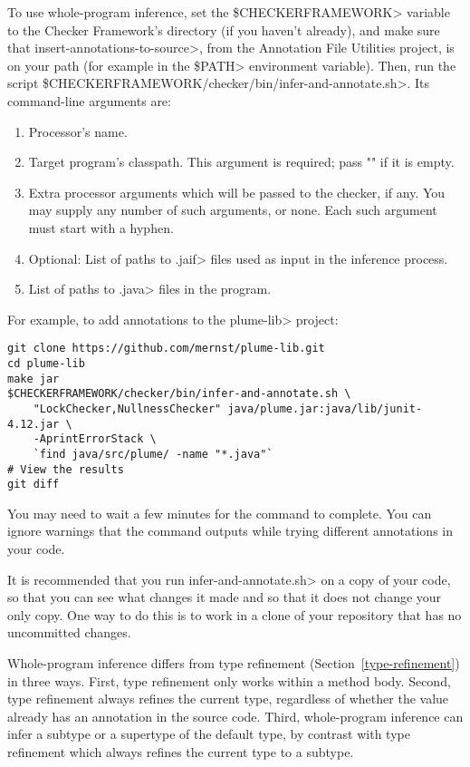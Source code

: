 \begin{sloppypar}
To use whole-program inference,
set the \<\$CHECKERFRAMEWORK> variable to the Checker Framework's
directory (if you haven't already), and make sure that
\<insert-annotations-to-source>, from the Annotation File Utilities project,
is on your path (for example in the \<\$PATH> environment variable).
Then, run the script \<\$CHECKERFRAMEWORK/checker/bin/infer-and-annotate.sh>.
Its command-line arguments are:
\end{sloppypar}

\begin{enumerate}
\item Processor's name.
\item Target program's classpath.  This argument is required; pass "" if it
  is empty.
\item Extra processor arguments which will be passed to the checker, if any.
  You may supply any number of such arguments, or none.  Each such argument
  must start with a hyphen.
\item Optional: List of paths to \<.jaif> files used as input in the inference
    process.
\item List of paths to \<.java> files in the program.
\end{enumerate}

For example, to add annotations to the \<plume-lib> project:
\begin{Verbatim}
git clone https://github.com/mernst/plume-lib.git
cd plume-lib
make jar
$CHECKERFRAMEWORK/checker/bin/infer-and-annotate.sh \
    "LockChecker,NullnessChecker" java/plume.jar:java/lib/junit-4.12.jar \
    -AprintErrorStack \
    `find java/src/plume/ -name "*.java"`
# View the results
git diff
\end{Verbatim}

You may need to wait a few minutes for the command to complete.
You can ignore warnings that the command outputs while trying different
annotations in your code.

It is recommended that you run \<infer-and-annotate.sh> on a copy of your
code, so that you can see what changes it made and so that it does not
change your only copy.  One way to do this is to work in a clone of your
repository that has no uncommitted changes.

Whole-program inference differs from type refinement (Section~\ref{type-refinement})
in three ways.  First, type refinement only works within a method body.
Second, type refinement always
refines the current type, regardless of whether the value already has an
annotation in the source code.
Third, whole-program inference can infer a subtype
or a supertype of the default type, by contrast with type refinement which
always refines the current type to a subtype.


